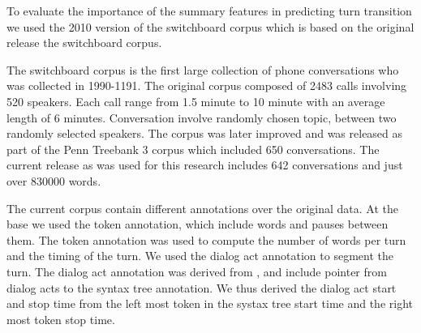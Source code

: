 To evaluate the importance of the summary features in predicting turn transition we used the 2010 version of the switchboard corpus \cite{calhoun2010nxt} which is based on the original release \cite{225858} the switchboard corpus.

The switchboard corpus is the first large collection of phone conversations who was collected in 1990-1191. The original corpus composed of 2483 calls involving 520 speakers. Each call range from 1.5 minute to 10 minute with an average length of 6 minutes. Conversation involve randomly chosen topic, between two randomly selected speakers. The corpus was later improved and was released as part of the Penn Treebank 3 corpus which included 650 conversations. The current release as was used for this research includes 642 conversations and just over 830000 words.

The current corpus contain different annotations over the original data. At the base we used the token annotation, which include words and pauses between them. The token annotation was used to compute the number of words per turn and the timing of the turn. We used the dialog act annotation to segment the turn. The dialog act annotation was derived from , and include pointer from dialog acts to the syntax tree annotation. We thus derived the dialog act start and stop time from the left most token in the systax tree start time and the right most token stop time.

  
